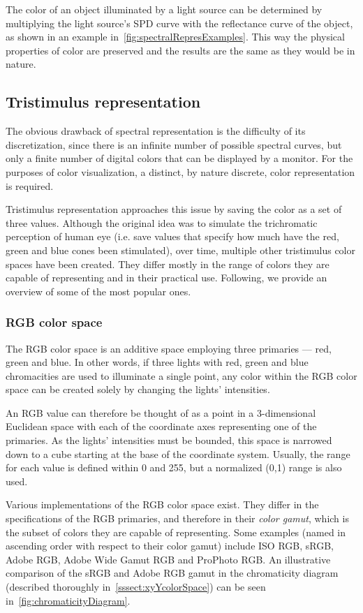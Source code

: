 The color of an object illuminated by a light source can be determined by multiplying the light source's SPD curve with the reflectance curve of the object, as shown in an example in~\cref{fig:spectralRepresExamples}. This way the physical properties of color are preserved and the results are the same as they would be in nature.

\subsection{Tristimulus representation} \label{ssec:tristimulusRepres}

The obvious drawback of spectral representation is the difficulty of its discretization, since there is an infinite number of possible spectral curves, but only a finite number of digital colors that can be displayed by a monitor. For the purposes of color visualization, a distinct, by nature discrete, color
representation is required. 

Tristimulus representation approaches this issue by saving the color as a set of three values. Although the original idea was to simulate the trichromatic perception of human eye (i.e. save values that specify how much have the red, green and blue cones been stimulated), over time, multiple other tristimulus color spaces have been created. They differ mostly in the range of colors they are capable of representing and in their practical use. Following, we provide an overview of some of the most popular ones.

\subsubsection{RGB color space}
The RGB color space is an additive space employing three primaries --- red, green and blue. In other words, if three lights with red, green and blue chromacities are used to illuminate a single point, any color within the RGB color space can be created solely by changing the lights' intensities. 

An RGB value can therefore be thought of as a point in a 3-dimensional Euclidean space with each of the coordinate axes representing one of the primaries. As the lights' intensities must be bounded, this space is narrowed down to a cube starting at the base of the coordinate system. Usually, the range for each value is defined within 0 and 255, but a normalized (0,1) range is also used.

Various implementations of the RGB color space exist. They differ in the specifications of the RGB primaries, and therefore in their \emph{color gamut}, which is the subset of colors they are capable of representing. Some examples (named in ascending order with respect to their color gamut) include ISO RGB, sRGB, Adobe RGB, Adobe Wide Gamut RGB and ProPhoto RGB. An illustrative comparison of the sRGB and Adobe RGB gamut in the chromaticity diagram (described thoroughly in~\cref{sssect:xyYcolorSpace}) can be seen in~\cref{fig:chromaticityDiagram}.

